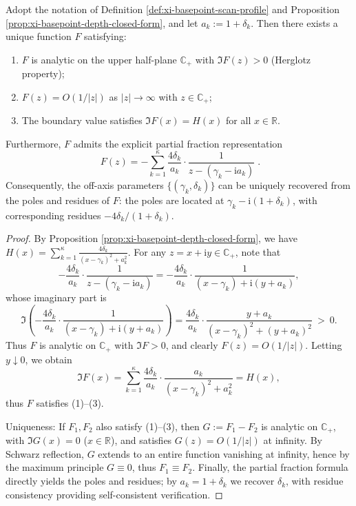 \begin{theorem}\label{thm:xi-basepoint-scan-rational-herglotz-pole-tomography}
Adopt the notation of Definition \ref{def:xi-basepoint-scan-profile} and Proposition \ref{prop:xi-basepoint-depth-closed-form}, and let \(a_k:=1+\delta_k\).
Then there exists a unique function \(F\) satisfying:
\begin{enumerate}
  \item \(F\) is analytic on the upper half-plane \(\mathbb{C}_{+}\) with \(\Im F(z)>0\) (Herglotz property);
  \item \(F(z)=O(1/|z|)\) as \(|z|\to\infty\) with \(z\in\mathbb{C}_{+}\);
  \item The boundary value satisfies \(\Im F(x)=H(x)\) for all \(x\in\mathbb{R}\).
\end{enumerate}
Furthermore, \(F\) admits the explicit partial fraction representation
\[
\boxed{\;
F(z)=
-\sum_{k=1}^{\kappa}\frac{4\delta_k}{a_k}\cdot\frac{1}{z-(\gamma_k-\mathrm{i}a_k)}\; }.
\]
Consequently, the off-axis parameters \(\{(\gamma_k,\delta_k)\}\) can be uniquely recovered from the poles and residues of \(F\): the poles are located at \(\gamma_k-\mathrm{i}(1+\delta_k)\), with corresponding residues \(-4\delta_k/(1+\delta_k)\).
\end{theorem}
\begin{proof}
By Proposition \ref{prop:xi-basepoint-depth-closed-form}, we have
\(
H(x)=\sum_{k=1}^{\kappa}\frac{4\delta_k}{(x-\gamma_k)^2+a_k^2}
\).
For any \(z=x+\mathrm{i}y\in\mathbb{C}_{+}\), note that
\[
-\frac{4\delta_k}{a_k}\cdot\frac{1}{z-(\gamma_k-\mathrm{i}a_k)}
=-\frac{4\delta_k}{a_k}\cdot\frac{1}{(x-\gamma_k)+\mathrm{i}(y+a_k)},
\]
whose imaginary part is
\[
\Im\!\left(-\frac{4\delta_k}{a_k}\cdot\frac{1}{(x-\gamma_k)+\mathrm{i}(y+a_k)}\right)
=\frac{4\delta_k}{a_k}\cdot\frac{y+a_k}{(x-\gamma_k)^2+(y+a_k)^2}\ >\ 0.
\]
Thus \(F\) is analytic on \(\mathbb{C}_{+}\) with \(\Im F>0\), and clearly \(F(z)=O(1/|z|)\).
Letting \(y\downarrow 0\), we obtain
\[
\Im F(x)
=\sum_{k=1}^{\kappa}\frac{4\delta_k}{a_k}\cdot\frac{a_k}{(x-\gamma_k)^2+a_k^2}
=H(x),
\]
thus \(F\) satisfies (1)--(3).
\par
Uniqueness: If \(F_1,F_2\) also satisfy (1)--(3), then \(G:=F_1-F_2\) is analytic on \(\mathbb{C}_{+}\), with \(\Im G(x)=0\) (\(x\in\mathbb{R}\)), and satisfies \(G(z)=O(1/|z|)\) at infinity.
By Schwarz reflection, \(G\) extends to an entire function vanishing at infinity, hence by the maximum principle \(G\equiv 0\), thus \(F_1\equiv F_2\).
Finally, the partial fraction formula directly yields the poles and residues; by \(a_k=1+\delta_k\) we recover \(\delta_k\), with residue consistency providing self-consistent verification.
\end{proof}

